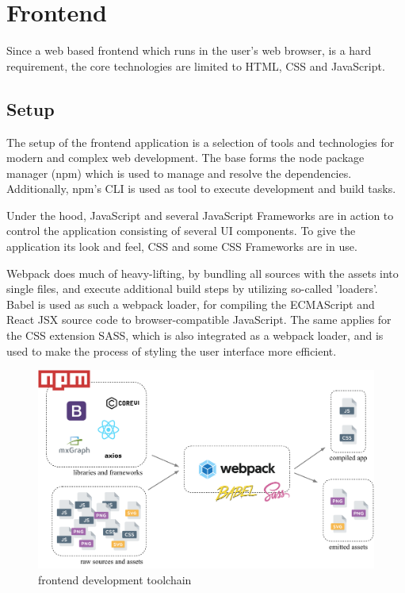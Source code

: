 \documentclass[a4paper,11pt,pdftex,halfparskip,cleardoubleempty,bibtotoc,liststotoc]{scrbook}
\begin{document}
\section{Frontend}
Since a web based frontend which runs in the user's web browser, is a hard requirement, the core technologies are limited to HTML, CSS and JavaScript.



\subsection{Setup}

The setup of the frontend application is a selection of tools and technologies for modern and complex web development.
The base forms the node package manager (npm) which is used to manage and resolve the dependencies. Additionally, npm's CLI is used as tool to execute development and build tasks.

Under the hood, JavaScript and several JavaScript Frameworks are in action to control the application consisting of several UI components. To give the application its look and feel, CSS and some CSS Frameworks are in use.

Webpack does much of heavy-lifting, by bundling all sources with the assets into single files, and execute additional build steps by utilizing so-called 'loaders'.
Babel is used as such a webpack loader, for compiling the ECMAScript and React JSX source code to browser-compatible JavaScript.
The same applies for the CSS extension SASS, which is also integrated as a webpack loader, and is used to make the process of styling the user interface more efficient.

\begin{figure}[htbp]
  \centering
  \vspace{0.8cm}
  \includegraphics[width=\textwidth]{frontend-setup}
  \caption{frontend development toolchain}
\end{figure}
\end{document}

